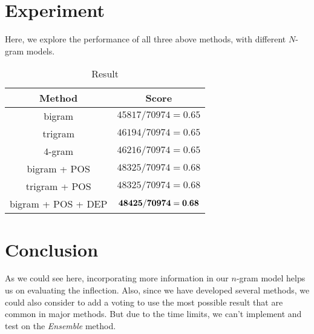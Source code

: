\documentclass[11pt]{article}
\begin{document}
\section{Experiment} %
\label{sec:experiment}
Here, we explore the performance of all three above methods, with different $N$-gram models.
\begin{table}[!htf]
\centering
\begin{tabular}{ | c | c |}
\hline
Method & Score\\
\hline
bigram & $45817 / 70974 = 0.65$\\
\hline
trigram & $46194 / 70974 = 0.65$ \\
\hline
$4$-gram & $46216 / 70974 = 0.65$ \\
\hline
bigram + POS & $48325 / 70974 = 0.68$ \\
\hline
trigram + POS & $48325 / 70974 = 0.68$ \\
\hline
bigram + POS + DEP & $\bf{48425 / 70974 = 0.68}$ \\
\hline
\end{tabular}
\caption{Result}
\end{table}

\section{Conclusion} %
\label{sec:conclusion}
As we could see here, incorporating more information in our $n$-gram model helps us on evaluating the inflection. Also, since we have developed several methods, we could also consider to add a voting to use the most possible result that are common in major methods. But due to the time limits, we can't implement and test on the \textit{Ensemble} method.
\end{document}
